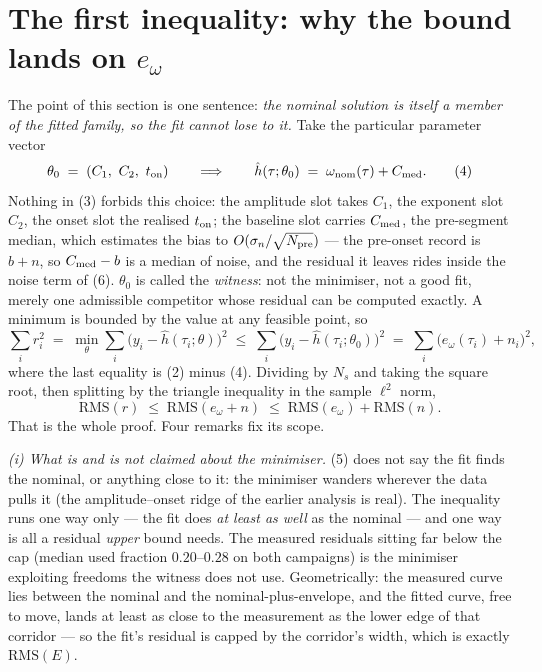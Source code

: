\documentclass[10pt]{article}
\newcommand{\rms}{\mathrm{RMS}}
\begin{document}
\section{The first inequality: why the bound lands on $e_\omega$}

The point of this section is one sentence: \emph{the nominal solution
is itself a member of the fitted family, so the fit cannot lose to
it.} Take the particular parameter vector
\begin{equation}
  \theta_0 \;=\; (C_1,\ C_2,\ t_{\rm on})
  \qquad\Longrightarrow\qquad
  \hat h(\tau;\theta_0) \;=\; \omega_{\rm nom}(\tau) + C_{\rm med} .
  \tag{4}
\end{equation}
Nothing in (3) forbids this choice: the amplitude slot takes $C_1$,
the exponent slot $C_2$, the onset slot the realised $t_{\rm on}$;
the baseline slot carries $C_{\rm med}$, the pre-segment median,
which estimates the bias to $O(\sigma_n/\sqrt{N_{\rm pre}})$ --- the
pre-onset record is $b + n$, so $C_{\rm med} - b$ is a median of
noise, and the residual it leaves rides inside the noise term of
(6). $\theta_0$ is called the \emph{witness}:
not the minimiser, not a good fit, merely one admissible competitor
whose residual can be computed exactly. A minimum is bounded by the
value at any feasible point, so
\begin{equation}
  \sum_i r_i^2
  \;=\; \min_\theta \sum_i \big(y_i - \hat h(\tau_i;\theta)\big)^2
  \;\le\; \sum_i \big(y_i - \hat h(\tau_i;\theta_0)\big)^2
  \;=\; \sum_i \big(e_\omega(\tau_i) + n_i\big)^2 ,
  \tag{5}
\end{equation}
where the last equality is (2) minus (4). Dividing by $N_s$ and
taking the square root, then splitting by the triangle inequality in
the sample $\ell^2$ norm,
\begin{equation}
  \rms(r) \;\le\; \rms(e_\omega + n)
  \;\le\; \rms(e_\omega) + \rms(n) .
  \tag{6}
\end{equation}
That is the whole proof. Four remarks fix its scope.

\emph{(i) What is and is not claimed about the minimiser.} (5) does
not say the fit finds the nominal, or anything close to it: the
minimiser wanders wherever the data pulls it (the amplitude--onset
ridge of the earlier analysis is real). The inequality runs one way
only --- the fit does \emph{at least as well} as the nominal --- and
one way is all a residual \emph{upper} bound needs. The measured
residuals sitting far below the cap (median used fraction
$0.20$--$0.28$ on both campaigns) is the minimiser exploiting
freedoms the witness does not use. Geometrically: the measured curve
lies between the nominal and the nominal-plus-envelope, and the
fitted curve, free to move, lands at least as close to the
measurement as the lower edge of that corridor --- so the fit's
residual is capped by the corridor's width, which is exactly
$\rms(E)$.
\end{document}
